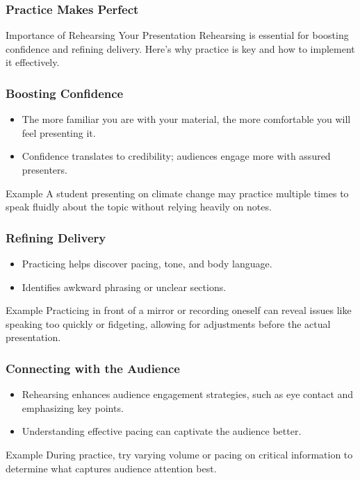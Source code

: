 \documentclass[aspectratio=169]{beamer}
\begin{document}
\begin{frame}[fragile]
    \frametitle{Practice Makes Perfect}
    \begin{block}{Importance of Rehearsing Your Presentation}
        Rehearsing is essential for boosting confidence and refining delivery. Here's why practice is key and how to implement it effectively.
    \end{block}
\end{frame}

\begin{frame}[fragile]
    \frametitle{Boosting Confidence}
    \begin{itemize}
        \item The more familiar you are with your material, the more comfortable you will feel presenting it.
        \item Confidence translates to credibility; audiences engage more with assured presenters.
    \end{itemize}
    \begin{exampleblock}{Example}
        A student presenting on climate change may practice multiple times to speak fluidly about the topic without relying heavily on notes.
    \end{exampleblock}
\end{frame}

\begin{frame}[fragile]
    \frametitle{Refining Delivery}
    \begin{itemize}
        \item Practicing helps discover pacing, tone, and body language.
        \item Identifies awkward phrasing or unclear sections.
    \end{itemize}
    \begin{exampleblock}{Example}
        Practicing in front of a mirror or recording oneself can reveal issues like speaking too quickly or fidgeting, allowing for adjustments before the actual presentation.
    \end{exampleblock}
\end{frame}

\begin{frame}[fragile]
    \frametitle{Connecting with the Audience}
    \begin{itemize}
        \item Rehearsing enhances audience engagement strategies, such as eye contact and emphasizing key points.
        \item Understanding effective pacing can captivate the audience better.
    \end{itemize}
    \begin{exampleblock}{Example}
        During practice, try varying volume or pacing on critical information to determine what captures audience attention best.
    \end{exampleblock}
\end{frame}
\end{document}
